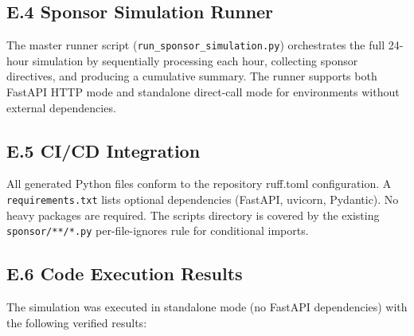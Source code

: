 \subsection*{E.4 Sponsor Simulation Runner}

The master runner script (\texttt{run\_sponsor\_simulation.py}) orchestrates
the full 24-hour simulation by sequentially processing each hour, collecting
sponsor directives, and producing a cumulative summary. The runner supports
both FastAPI HTTP mode and standalone direct-call mode for environments
without external dependencies.

\subsection*{E.5 CI/CD Integration}

All generated Python files conform to the repository ruff.toml configuration.
A \texttt{requirements.txt} lists optional dependencies (FastAPI, uvicorn,
Pydantic). No heavy packages are required. The scripts directory is covered
by the existing \texttt{sponsor/**/*.py} per-file-ignores rule for
conditional imports.

\subsection*{E.6 Code Execution Results}

The simulation was executed in standalone mode (no FastAPI dependencies)
with the following verified results:


